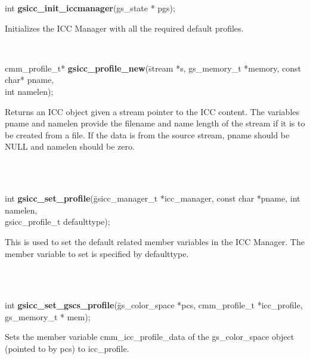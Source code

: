 \documentclass[12pt,notitlepage]{article}
\begin{document}
\noindent int {\bf gsicc\_init\_iccmanager}(gs\_state * pgs);\\

\begin{minipage}[h]{6.0in}
Initializes the ICC Manager with all the required default profiles.
\end{minipage}\\

\begin{tabbing}
\noindent cmm\_profile\_t* {\bf gsicc\_profile\_new}(\=stream *s, gs\_memory\_t *memory, const char* pname, \\
\>int namelen);\\
\end{tabbing}

\begin{minipage}[h]{6.0in}
Returns an ICC object given a stream pointer to the ICC content.  The variables pname and namelen provide the filename and name length of the stream if it is to be created from a file.  If the data is from the source stream, pname should be NULL and namelen should be zero.
\end{minipage}\\
\\

\begin{tabbing}
\noindent int {\bf gsicc\_set\_profile}(\=gsicc\_manager\_t *icc\_manager, const char *pname, int namelen, \\
\>gsicc\_profile\_t defaulttype);\\
\end{tabbing}

\begin{minipage}[h]{6.0in}
This is used to set the default related member variables in the ICC Manager.  The member variable to set is specified by defaulttype.
\end{minipage}\\
\\

\begin{tabbing}
\noindent int {\bf gsicc\_set\_gscs\_profile}(\=gs\_color\_space *pcs, cmm\_profile\_t *icc\_profile, \\
\> gs\_memory\_t * mem);\\
\end{tabbing}

\begin{minipage}[h]{6.0in}
Sets the member variable cmm\_icc\_profile\_data of the gs\_color\_space object (pointed to by pcs) to icc\_profile.
\end{minipage}\\
\\
\end{document}
